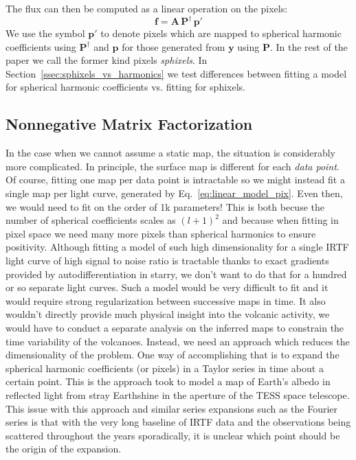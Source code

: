 \documentclass[modern]{aastex62}
\begin{document}
The flux can then be computed as a linear operation on the pixels: 
\begin{equation}
    \mathbf{f}=\mathbf{A}\,\mathbf{P}^\dagger\,\mathbf{p}'
    \label{eq:linear_model_pix}
\end{equation}
We use the symbol $\mathbf{p}'$ to denote pixels which are mapped to spherical harmonic coefficients using $\mathbf{P}^\dagger$ and $\mathbf{p}$ for those generated from $\mathbf{y}$ using $\mathbf{P}$.
In the rest of the paper we call the former kind pixels \emph{sphixels}.
In Section~\ref{ssec:sphixels_vs_harmonics} we test differences between fitting a model for spherical harmonic coefficients vs. fitting for sphixels.

\subsection{Nonnegative Matrix Factorization}
\label{ssec:nmf}
In the case when we cannot assume a static map, the situation is considerably more complicated.
In principle, the surface map is different for each \emph{data point}.
Of course, fitting one map per data point is intractable so we might instead fit a single map per light curve, generated by Eq.~\ref{eq:linear_model_pix}.
Even then, we would need to fit on the order of 1k parameters!
This is both becuse the number of spherical coefficients scales as $(l+1)^2$ and because when fitting in pixel space we need many more pixels than spherical harmonics to ensure positivity.
Although fitting a model of such high dimensionality for a single IRTF light curve of high signal to noise ratio is tractable thanks to exact gradients provided by autodifferentiation in \textsf{starry}, we don't want to do that for a hundred or so separate light curves.
Such a model would be very difficult to fit and it would require strong regularization between successive maps in time.
It also wouldn't directly provide much physical insight into the volcanic activity, we would have to conduct a separate analysis on the inferred maps to constrain the time variability of the volcanoes.
Instead, we need an approach which reduces the dimensionality of the problem.
One way of accomplishing that is to expand the spherical harmonic coefficients (or pixels) in a Taylor series in time about a certain point.
This is the approach \cite{luger_tess_2019} took to model a map of Earth's albedo in reflected light from stray Earthshine in the aperture of the TESS space telescope.
This issue with this approach and similar series expansions such as the Fourier series is that with the very long baseline of IRTF data and the observations being scattered throughout the years sporadically, it is unclear which point should be the origin of the expansion.
\end{document}
